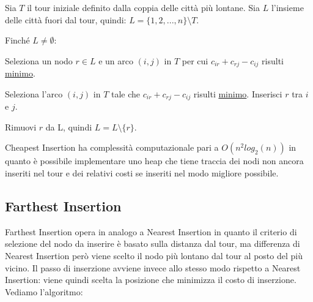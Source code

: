 \documentclass[a4paper,12pt]{report}
\begin{document}
\begin{tcolorbox}[colframe=black,colback=white,boxrule=0.5pt, sharp corners]
  \begin{legal}
    \item Sia $T$ il tour iniziale definito dalla coppia delle città più lontane. Sia $L$ l'insieme delle città fuori dal tour, quindi: $L = \{1, 2, ..., n\} \setminus T$.
    \item Finché $L \neq \emptyset$:
    \begin{legal}
      \item Seleziona un nodo $r \in L$ e un arco $(i, j)$ in $T$ per cui $c_{ir} + c_{rj} - c_{ij}$ risulti \underline{minimo}.
      \item Seleziona l'arco $(i, j)$ in $T$ tale che $c_{ir} + c_{rj} - c_{ij}$ risulti \underline{minimo}. Inserisci $r$ tra $i$ e $j$.
      \item Rimuovi $r$ da L, quindi $L = L \setminus \{r\}$.
    \end{legal}
  \end{legal}
  \end{tcolorbox}
\hfill \break Cheapest Insertion ha complessità computazionale pari a $O(n^2 log_2(n))$ in quanto è possibile implementare uno heap che tiene traccia dei nodi non ancora inseriti nel tour e dei relativi costi se inseriti nel modo migliore possibile.

\subsection{Farthest Insertion}
Farthest Insertion opera in analogo a Nearest Insertion in quanto il criterio di selezione del nodo da inserire è basato sulla distanza dal tour, ma differenza di Nearest Insertion però viene scelto il nodo più lontano dal tour al posto del più vicino. Il passo di inserzione avviene invece allo stesso modo rispetto a Nearest Insertion: viene quindi scelta la posizione che minimizza il costo di inserzione. Vediamo l'algoritmo:
\end{document}
